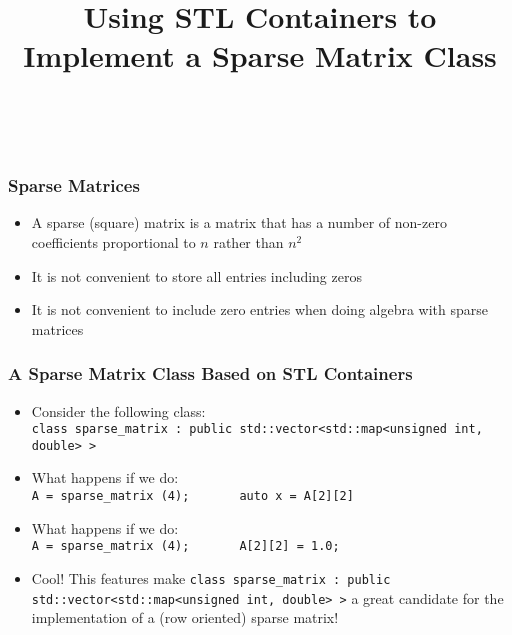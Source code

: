 \documentclass[smaller,a4paper]{beamer}
\newcommand{\cpp}[1]{\lstinline!#1!}
\begin{document}
\title{Using STL Containers to Implement a Sparse Matrix Class}
\frame{\titlepage}


\begin{frame}[fragile]
\    \frametitle{Sparse Matrices}
\begin{itemize}
\item A sparse (square) matrix is a matrix that has a number of non-zero coefficients proportional to $n$ rather than $n^{2}$
\item It is not convenient to store all entries including zeros
\item It is not convenient to include zero entries when doing algebra with sparse matrices
\end{itemize}
\end{frame}

\begin{frame}
    \frametitle{A Sparse Matrix Class Based on STL Containers}
\begin{itemize}
\item Consider the following class:\\[3mm]
\cpp{class sparse_matrix : public std::vector<std::map<unsigned int, double> >}
\item What happens if we do:\\[3mm]
\cpp{A = sparse_matrix (4); 
     auto x = A[2][2] }
\item What happens if we do:\\[3mm]
\cpp{A = sparse_matrix (4); 
     A[2][2] = 1.0;}

\item Cool! This features make \cpp{class sparse_matrix : public std::vector<std::map<unsigned int, double> >}
      a great candidate for the implementation of a (row oriented) sparse matrix!
\end{itemize}
\end{frame}
\end{document}
